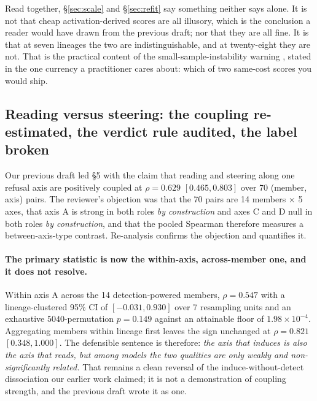 \documentclass[11pt,letterpaper]{article}
\begin{document}
Read together, \S\ref{sec:scale} and \S\ref{sec:refit} say something neither says alone. It is not that cheap activation-derived scores are all illusory, which is the conclusion a reader would have drawn from the previous draft; nor that they are all fine. It is that at seven lineages the two are indistinguishable, and at twenty-eight they are not. That is the practical content of the small-sample-instability warning \citep{Wang2026}, stated in the one currency a practitioner cares about: which of two same-cost scores you would ship.

\subsection{Reading versus steering: the coupling re-estimated, the verdict rule audited, the label broken}
\label{sec:coupling}

Our previous draft led \S5 with the claim that reading and steering along one refusal axis are positively coupled at $\rho = 0.629$ $[0.465, 0.803]$ over 70 (member, axis) pairs. The reviewer's objection was that the 70 pairs are 14 members $\times$ 5 axes, that axis A is strong in both roles \emph{by construction} and axes C and D null in both roles \emph{by construction}, and that the pooled Spearman therefore measures a between-axis-type contrast. Re-analysis confirms the objection and quantifies it.

\paragraph{The primary statistic is now the within-axis, across-member one, and it does not resolve.} Within axis A across the 14 detection-powered members, $\rho = 0.547$ with a lineage-clustered 95\% CI of $[-0.031, 0.930]$ over 7 resampling units and an exhaustive $5040$-permutation $p = 0.149$ against an attainable floor of $1.98\times10^{-4}$. Aggregating members within lineage first leaves the sign unchanged at $\rho = 0.821$ $[0.348, 1.000]$. The defensible sentence is therefore: \emph{the axis that induces is also the axis that reads, but among models the two qualities are only weakly and non-significantly related.} That remains a clean reversal of the induce-without-detect dissociation our earlier work claimed; it is not a demonstration of coupling strength, and the previous draft wrote it as one.
\end{document}
